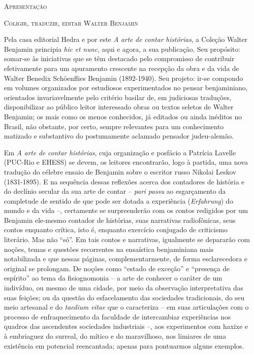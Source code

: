 \textsc{Apresentação}

\textsc{Coligir, traduzir, editar Walter} \textsc{Benjamin}

Pela casa editorial Hedra e por este \emph{A} \emph{arte de contar
histórias}, a Coleção Walter Benjamin principia \emph{hic et nunc}, aqui
e agora, a sua publicação. Seu propósito: somar-se às iniciativas que se
têm destacado pelo compromisso de contribuir efetivamente para um
apuramento crescente na recepção da obra e da vida de Walter Benedix
Schöenflies Benjamin (1892-1940). Seu projeto: ir-se compondo em volumes
organizados por estudiosos experimentados no pensar benjaminiano,
orientados invariavelmente pelo critério basilar de, em judiciosas
traduções, disponibilizar ao público leitor interessado obras ou textos
seletos de Walter Benjamin; os mais como os menos conhecidos, já
editados ou ainda inéditos no Brasil, não obstante, por certo, sempre
relevantes para um conhecimento matizado e substantivo do postumamente
aclamado pensador judeu-alemão.

Em \emph{A arte de contar histórias}, cuja organização e posfácio a
Patrícia Lavelle (PUC-Rio e EHESS) se devem, os leitores encontrarão,
logo à partida, uma nova tradução do célebre ensaio de Benjamin sobre o
escritor russo Nikolai Leskov (1831-1895). E na sequência dessas
reflexões acerca dos contadores de história e do declínio secular da sua
arte de contar -- \emph{pari passu} ao esgarçamento da completude de
sentido de que pode ser dotada a experiência (\emph{Erfahrung}) do mundo
e da vida --, certamente se surpreenderão com os contos redigidos por um
Benjamin ele-mesmo contador de histórias, suas narrativas radiofônicas,
seus contos enquanto crítica, isto é, enquanto exercício conjugado de
criticismo literário. Mas não ``só''. Em tais contos e narrativas,
igualmente se depararão com noções, temas e questões recorrentes na
ensaística benjaminiana mais notabilizada e que nessas páginas,
complementarmente, de forma esclarecedora e original se prolongam. De
noções como ``estado de exceção'' e ``presença de espírito'' ao tema da
fisiognomonia -- a arte de conhecer o caráter de um indivíduo, ou mesmo
de uma cidade, por meio da observação interpretativa das suas feições;
ou da questão do esfacelamento das sociedades tradicionais, do seu meio
artesanal e do \emph{taedium vitae} que o caracteriza -- em suas
articulações com o processo de enfraquecimento da faculdade de
intercambiar experiências nos quadros das ascendentes sociedades
industriais --, aos experimentos com haxixe e à embriaguez do surreal,
do mítico e do maravilhoso, nos limiares de uma existência em potencial
reencantada; apenas para pontuarmos alguns exemplos.

